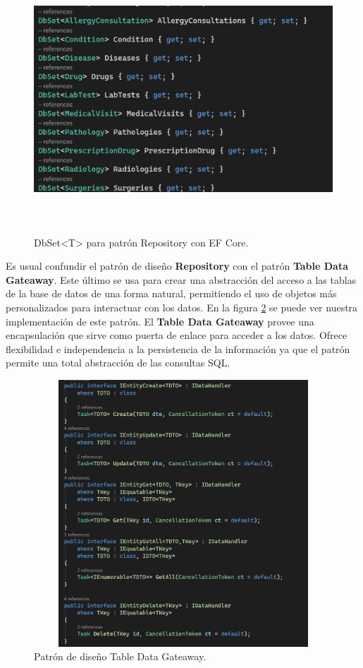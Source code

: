 \begin{figure}[H]
	\centering
	\includegraphics[width = 12cm, height=10cm]{Graphics/ef_core_repository_pattern.jpg}
	\caption{DbSet<T> para patrón Repository con EF Core.}
	\label{fig:EfCoreRepository}
\end{figure}

Es usual confundir el patrón de diseño \textbf{Repository} con el patrón \textbf{Table Data Gateaway}. Este último se usa para crear una abstracción del acceso a las tablas de la base de datos de una forma natural, permitiendo el uso de objetos más personalizados para interactuar con los datos. En la figura \ref{fig:tableDataGateaway} se puede ver nuestra implementación de este patrón. El \textbf{Table Data Gateaway} provee una encapsulación que sirve como puerta de enlace para acceder a los datos. Ofrece flexibilidad e independencia a la persistencia de la información ya que el patrón permite una total abstracción de las consultas SQL.

\begin{figure}[H]
	\centering
	\includegraphics[width = 12cm, height=10cm]{Graphics/table_data_gateaway_pattern.jpg}
	\caption{Patrón de diseño Table Data Gateaway.}
	\label{fig:tableDataGateaway}
\end{figure}

